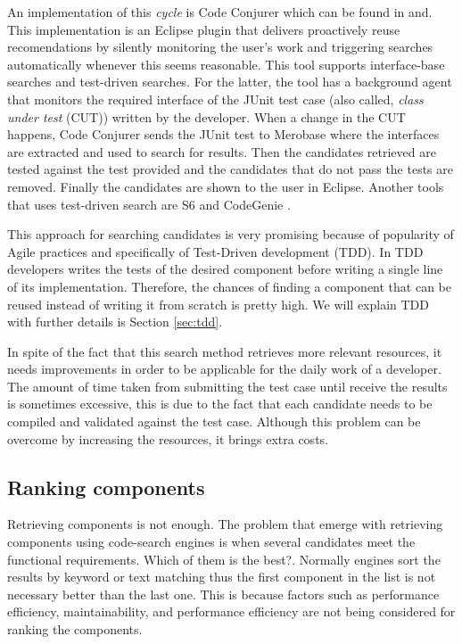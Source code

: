 An implementation of this \textit{cycle} is Code Conjurer which can be found in \cite{Hummel2008} and\cite{Hummel2013}. This implementation is an Eclipse plugin that delivers proactively reuse recomendations by silently monitoring the user's work and triggering searches automatically whenever this seems reasonable. This tool supports interface-base searches and test-driven searches. For the latter, the tool has a background agent that monitors the required interface of the JUnit test case (also called, \textit{class under test} (CUT)) written by the developer. When a change in the CUT happens, Code Conjurer sends the JUnit test to Merobase where the interfaces are extracted and used to search for results. Then the candidates retrieved are tested against the test provided and the candidates that do not pass the tests are removed. Finally the candidates are shown to the user in Eclipse. Another tools that uses test-driven search are S6 \cite{Reiss2009} and CodeGenie \cite{Lemos2007}.

This approach for searching candidates is very promising because of popularity of Agile practices and specifically of Test-Driven development (TDD)\cite{Beck2003}. In TDD developers writes the tests of the desired component before writing a single line of its implementation. Therefore, the chances of finding a component that can be reused instead of writing it from scratch is pretty high. We will explain TDD with further details is Section \ref{sec:tdd}.

In spite of the fact that this search method retrieves more relevant resources, it needs improvements in order to be applicable for the daily work of a developer. The amount of time taken from submitting the test case until receive the results is sometimes excessive, this is due to the fact that each candidate needs to be compiled and validated against the test case. Although this problem can be overcome by increasing the resources, it brings extra costs. 

\subsection{Ranking components}
Retrieving components is not enough. The problem that emerge with retrieving components using code-search engines is when several candidates meet the functional requirements. Which of them is the best?. Normally engines sort the results by keyword or text matching thus the first component in the list is not necessary better than the last one. This is because factors such as performance efficiency, maintainability, and performance efficiency are not being considered for ranking the components.

